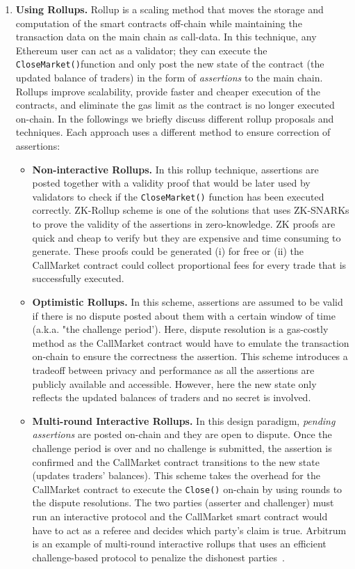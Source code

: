 \begin{enumerate}

\item \textbf{Using Rollups.} Rollup is a scaling method that moves the storage and computation of the smart contracts off-chain while maintaining the transaction data on the main chain as call-data. In this technique, any Ethereum user can act as a validator; they can execute the \texttt{CloseMarket()}function and only post the new state of the contract (the updated balance of traders) in the form of \textit{assertions} to the main chain. Rollups improve scalability, provide faster and cheaper execution of the contracts, and eliminate the gas limit as the contract is no longer executed on-chain.
In the followings we briefly discuss different rollup proposals and techniques. Each approach uses a different method to ensure correction of assertions:


\begin{itemize}

\item \textbf{{Non-interactive Rollups.}} In this rollup technique, assertions are posted together with a validity proof that would be later used by validators to check if the \texttt{CloseMarket()} function has been executed correctly. ZK-Rollup scheme is one of the solutions that uses ZK-SNARKs to prove the validity of the assertions in zero-knowledge. ZK proofs are quick and cheap to verify but they are expensive and time consuming to generate. These proofs could be generated (i) for free or (ii) the CallMarket contract could collect proportional fees for every trade that is successfully executed.

\item \textbf{{Optimistic Rollups.}} In this scheme, assertions are assumed to be valid if there is no dispute posted about them with a certain window of time (a.k.a. "the challenge period'). Here, dispute resolution is a gas-costly method as the CallMarket contract would have to emulate the transaction on-chain to ensure the correctness the assertion. This scheme introduces a tradeoff between privacy and performance as all the assertions are publicly available and accessible. However, here the new state only reflects the updated balances of traders and no secret is involved. 

\item \textbf {{Multi-round Interactive Rollups.}} In this design paradigm, \textit{pending assertions} are posted on-chain and they are open to dispute. Once the challenge period is over and no challenge is submitted, the assertion is confirmed and the CallMarket contract transitions to the new state (\ie updates traders' balances). This scheme takes the overhead for the CallMarket contract to execute the \texttt{Close()} on-chain by using rounds to the dispute resolutions. The two parties (asserter and challenger) must run an interactive protocol and the CallMarket smart contract would have to act as a referee and decides which party's claim is true. Arbitrum is an example of multi-round interactive rollups that uses an efficient challenge-based protocol to penalize the dishonest parties~\cite{kalodner2018arbitrum}. 


\end{itemize}
\end{enumerate}
